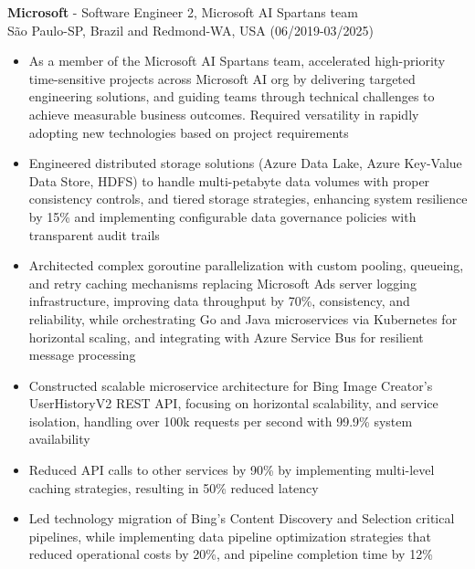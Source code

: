 
\normalsize{\textbf{Microsoft} - Software Engineer 2, Microsoft AI Spartans team}\\
    \footnotesize{São Paulo-SP, Brazil and Redmond-WA, USA (06/2019-03/2025)}

\begin{itemize}
    \item \small{As a member of the Microsoft AI Spartans team, accelerated high-priority time-sensitive projects
        across Microsoft AI org by delivering targeted engineering solutions, and guiding teams through technical
        challenges to achieve measurable business outcomes. Required versatility in rapidly adopting new technologies
        based on project requirements}

    \item \small{Engineered distributed storage solutions (Azure Data Lake, Azure Key-Value Data Store, HDFS) to handle
        multi-petabyte data volumes with proper consistency controls, and tiered storage strategies, enhancing system
        resilience by 15\% and implementing configurable data governance policies with transparent audit trails}

    \item \small{Architected complex goroutine parallelization with custom pooling, queueing, and retry caching
        mechanisms replacing Microsoft Ads server logging infrastructure, improving data throughput by 70\%,
        consistency, and reliability, while orchestrating Go and Java microservices via Kubernetes for horizontal 
        scaling, and integrating with Azure Service Bus for resilient message processing}

    \item \small{Constructed scalable microservice architecture for Bing Image Creator's UserHistoryV2 REST API,
        focusing on horizontal scalability, and service isolation, handling over 100k requests per second with 99.9\%
        system availability}

    \item \small{Reduced API calls to other services by 90\% by implementing multi-level caching strategies, resulting
        in 50\% reduced latency}

    \item \small{Led technology migration of Bing's Content Discovery and Selection critical pipelines,
        while implementing data pipeline optimization strategies that reduced operational costs by 20\%, and pipeline
        completion time by 12\%}


\end{itemize}
